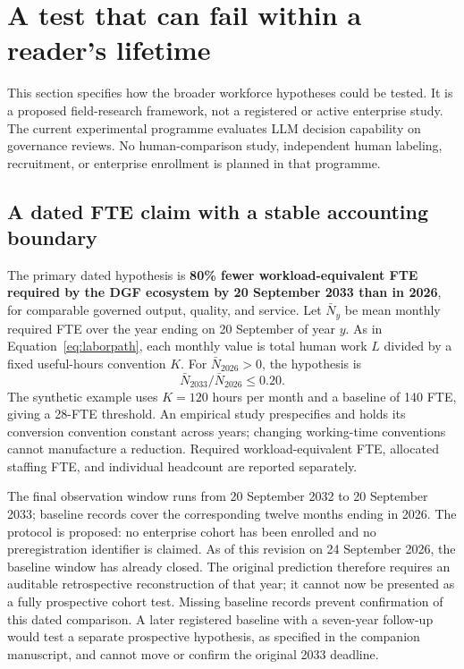 \section{A test that can fail within a reader's lifetime}
\label{sec:testing}

This section specifies how the broader workforce hypotheses could be tested. It is a proposed
field-research framework, not a registered or active enterprise study. The current experimental
programme evaluates LLM decision capability on governance reviews. No human-comparison study,
independent human labeling, recruitment, or enterprise enrollment is planned in that programme.

\subsection{A dated FTE claim with a stable accounting boundary}

The primary dated hypothesis is \textbf{80\% fewer workload-equivalent FTE required by the DGF
ecosystem by 20 September 2033 than in 2026}, for comparable governed output, quality, and service.
Let $\bar N_y$ be mean monthly required FTE over the year ending on 20 September of year $y$.
As in Equation~\eqref{eq:laborpath}, each monthly value is total human work $L$ divided by a fixed
useful-hours convention $K$. For $\bar N_{2026}>0$, the hypothesis is
\begin{equation}
\bar N_{2033}/\bar N_{2026}\le 0.20. \label{eq:workforce2033}
\end{equation}
The synthetic example uses $K=120$ hours per month and a baseline of 140 FTE, giving a 28-FTE
threshold. An empirical study prespecifies and holds its conversion convention constant across years;
changing working-time conventions cannot manufacture a reduction. Required workload-equivalent FTE,
allocated staffing FTE, and individual headcount are reported separately.

The final observation window runs from 20 September 2032 to 20 September 2033; baseline records cover
the corresponding twelve months ending in 2026. The protocol is proposed: no enterprise cohort has
been enrolled and no preregistration identifier is claimed. As of this revision on 24 September
2026, the baseline window has already closed. The original prediction therefore requires an
auditable retrospective reconstruction of that year; it cannot now be presented as a fully
prospective cohort test. Missing baseline records prevent confirmation of this dated comparison.
A later registered baseline with a seven-year follow-up would test a separate prospective
hypothesis, as specified in the companion manuscript, and cannot move or confirm the original
2033 deadline.

